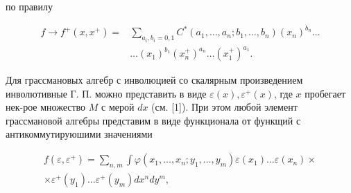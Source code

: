 \documentclass[10pt]{article}
\begin{document}
по правилу



\[

\begin{aligned}

f \rightarrow f^{+}\left(x, x^{+}\right)= & \sum_{a_{i}, b_{i}=0,1} C^{*}\left(a_{1}, \ldots, a_{n} ; b_{1}, \ldots, b_{n}\right)\left(x_{n}\right)^{b_{n}} \ldots \\

& \ldots\left(x_{1}\right)^{b_{1}}\left(x_{n}^{+}\right)^{a_{n}} \ldots\left(x_{1}^{+}\right)^{a_{1}} .

\end{aligned}

\]



Для грассмановых алгебр с инволюцией со скалярным произведением инволютивные Г. П. можно представить в виде $\varepsilon(x), \varepsilon^{+}(x)$, где $x$ пробегает нек-рое множество $M$ с мерой $d x$ (см. [1]). При этом любой элемент грассмановой алгебры представим в виде функционала от функщий с антикоммутируюшими значениями



\[

\begin{gathered}

f\left(\varepsilon, \varepsilon^{+}\right)=\sum_{n, m} \int \varphi\left(x_{1}, \ldots, x_{n} ; y_{1}, \ldots, y_{m}\right) \varepsilon\left(x_{1}\right) \ldots \varepsilon\left(x_{n}\right) \times \\

\times \varepsilon^{+}\left(y_{1}\right) \ldots \varepsilon^{+}\left(y_{m}\right) d x^{n} d y^{m},

\end{gathered}

\]
\end{document}
